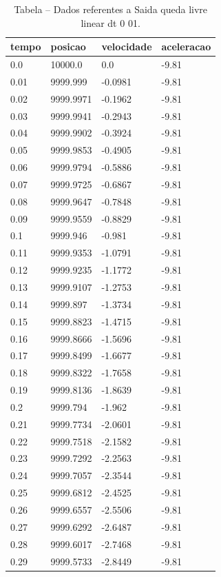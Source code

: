 \begin{table}[H]
\centering
\caption{Tabela – Dados referentes a Saida queda livre linear dt 0 01.}
\label{tab:saida_queda_livre_linear_dt_0_01}
\begin{tabular}{llll}
\toprule
tempo & posicao & velocidade & aceleracao \\
\midrule
0.0 & 10000.0 & 0.0 & -9.81 \\
0.01 & 9999.999 & -0.0981 & -9.81 \\
0.02 & 9999.9971 & -0.1962 & -9.81 \\
0.03 & 9999.9941 & -0.2943 & -9.81 \\
0.04 & 9999.9902 & -0.3924 & -9.81 \\
0.05 & 9999.9853 & -0.4905 & -9.81 \\
0.06 & 9999.9794 & -0.5886 & -9.81 \\
0.07 & 9999.9725 & -0.6867 & -9.81 \\
0.08 & 9999.9647 & -0.7848 & -9.81 \\
0.09 & 9999.9559 & -0.8829 & -9.81 \\
0.1 & 9999.946 & -0.981 & -9.81 \\
0.11 & 9999.9353 & -1.0791 & -9.81 \\
0.12 & 9999.9235 & -1.1772 & -9.81 \\
0.13 & 9999.9107 & -1.2753 & -9.81 \\
0.14 & 9999.897 & -1.3734 & -9.81 \\
0.15 & 9999.8823 & -1.4715 & -9.81 \\
0.16 & 9999.8666 & -1.5696 & -9.81 \\
0.17 & 9999.8499 & -1.6677 & -9.81 \\
0.18 & 9999.8322 & -1.7658 & -9.81 \\
0.19 & 9999.8136 & -1.8639 & -9.81 \\
0.2 & 9999.794 & -1.962 & -9.81 \\
0.21 & 9999.7734 & -2.0601 & -9.81 \\
0.22 & 9999.7518 & -2.1582 & -9.81 \\
0.23 & 9999.7292 & -2.2563 & -9.81 \\
0.24 & 9999.7057 & -2.3544 & -9.81 \\
0.25 & 9999.6812 & -2.4525 & -9.81 \\
0.26 & 9999.6557 & -2.5506 & -9.81 \\
0.27 & 9999.6292 & -2.6487 & -9.81 \\
0.28 & 9999.6017 & -2.7468 & -9.81 \\
0.29 & 9999.5733 & -2.8449 & -9.81 \\

\end{tabular}
\end{table}
